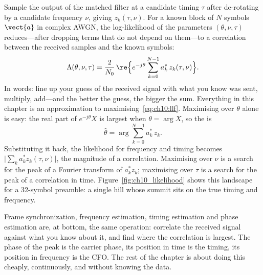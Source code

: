 Sample the output of the matched filter at a candidate timing $\tau$ after de-rotating by a
candidate frequency $\nu$, giving $z_k(\tau,\nu)$. For a known block of $N$ symbols $\vect{a}$ in
complex AWGN, the log-likelihood of the parameters $(\theta,\nu,\tau)$ reduces---after dropping terms
that do not depend on them---to a correlation between the received samples and the known symbols:
\begin{equation}
\Lambda(\theta,\nu,\tau)=\frac{2}{N_0}\,\re\Bigl\{e^{-j\theta}\sum_{k=0}^{N-1}a_k^*\,z_k(\tau,\nu)\Bigr\}.
\label{eq:ch10:llf}
\end{equation}
In words: line up your guess of the received signal with what you know was sent, multiply,
add---and the better the guess, the bigger the sum. Everything in this chapter is an approximation
to maximising~\eqref{eq:ch10:llf}. Maximising over $\theta$ alone is easy: the real part of
$e^{-j\theta}X$ is largest when $\theta=\arg X$, so the  is
\begin{equation}
\hat\theta=\arg\sum_{k=0}^{N-1}a_k^*\,z_k .
\label{eq:ch10:mlphase}
\end{equation}
Substituting it back, the likelihood for frequency and timing becomes
$\bigl|\sum_k a_k^*z_k(\tau,\nu)\bigr|$, the magnitude of a correlation. Maximising over $\nu$ is a
search for the peak of a Fourier transform of $a_k^*z_k$; maximising over $\tau$ is a search for
the peak of a correlation in time. Figure~\ref{fig:ch10_likelihood} shows this landscape for a
32-symbol preamble: a single hill whose summit sits on the true timing and frequency.


\begin{keyidea}
Frame synchronization, frequency estimation, timing estimation and phase estimation are, at
bottom, the same operation: correlate the received signal against what you know about it, and
find where the correlation is largest. The phase of the peak is the carrier phase, its position
in time is the timing, its position in frequency is the CFO. The rest of the chapter is about
doing this cheaply, continuously, and without knowing the data.
\end{keyidea}

